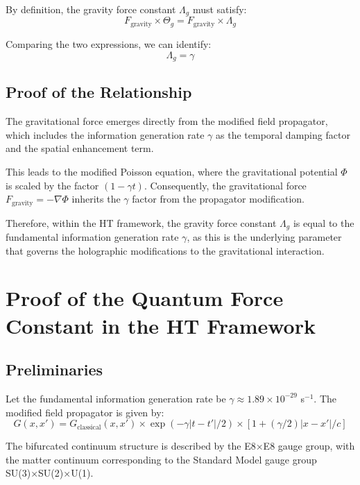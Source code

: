 \documentclass{article}
\theoremstyle{plain}
\theoremstyle{definition}
\theoremstyle{remark}
\begin{document}
By definition, the gravity force constant $\Lambda_g$ must satisfy:
\begin{equation}
F_\text{gravity} \times \Theta_g = F_\text{gravity} \times \Lambda_g
\end{equation}

Comparing the two expressions, we can identify:
\begin{equation}
\Lambda_g = \gamma
\end{equation}

\subsection{Proof of the Relationship}

The gravitational force emerges directly from the modified field propagator, which includes the information generation rate $\gamma$ as the temporal damping factor and the spatial enhancement term.

This leads to the modified Poisson equation, where the gravitational potential $\Phi$ is scaled by the factor $(1 - \gamma t)$. Consequently, the gravitational force $F_\text{gravity} = -\nabla \Phi$ inherits the $\gamma$ factor from the propagator modification.

Therefore, within the HT framework, the gravity force constant $\Lambda_g$ is equal to the fundamental information generation rate $\gamma$, as this is the underlying parameter that governs the holographic modifications to the gravitational interaction.

\section{Proof of the Quantum Force Constant in the HT Framework}

\subsection{Preliminaries}

Let the fundamental information generation rate be $\gamma \approx 1.89 \times 10^{-29}$ s$^{-1}$. The modified field propagator is given by:
\begin{equation}
G(x,x') = G_\text{classical}(x,x') \times \exp(-\gamma|t-t'|/2) \times \left[1 + (\gamma/2)|x-x'|/c\right]
\end{equation}

The bifurcated continuum structure is described by the E8×E8 gauge group, with the matter continuum corresponding to the Standard Model gauge group SU(3)×SU(2)×U(1).
\end{document}
